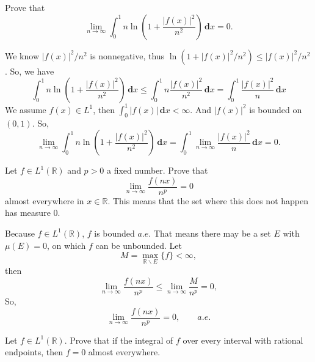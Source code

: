 \documentclass[12pt]{article}
\newenvironment{exercise}[1]{\begin{tcolorbox}[colback=black!15, colframe=black!80, breakable, title=#1]}{\end{tcolorbox}}
\newenvironment{solution}{\begin{tcolorbox}[colback=white, colframe=black!50, breakable, title=Solution. ]\setlength{\parskip}{0.8em}}{\end{tcolorbox}}
\newcommand{\der}{\,\mathbf{d}}
\begin{document}
    \begin{exercise}{9}
        Prove that 
        \[
            \lim_{n\to \infty}\int_0^1 n\ln(1+\frac{|f(x)|^2}{n^2})\der x=0. 
        \]
    \end{exercise}

    \begin{solution}
        We know $|f(x)|^2/n^2$ is nonnegative, thus $\ln(1+|f(x)|^2/n^2)\leqslant |f(x)|^2/n^2$. So, we have
        \[
            \int_0^1n\ln\left(1+\frac{|f(x)|^2}{n^2}\right)\der x\leqslant \int_0^1n\frac{|f(x)|^2}{n^2}\der x=\int_0^1\frac{|f(x)|^2}{n}\der x
        \]
        We assume $f(x)\in L^1$, then $\int_0^1|f(x)|\der x<\infty$. And $|f(x)|^2$ is bounded on $(0,1)$. So, 
        \[
            \lim_{n\to \infty}\int_0^1 n\ln\left(1+\frac{|f(x)|^2}{n^2}\right)\der x=\int_0^1\lim_{n\to \infty}\frac{|f(x)|^2}{n}\der x=0. 
        \]
    \end{solution}

    \begin{exercise}{10}
        Let $f \in L^1(\mathbb{R})$ and $p > 0$ a fixed number. Prove that
        \[
            \lim_{n\to\infty}\frac{f(nx)}{n^p}=0
        \]
        almost everywhere in $x \in \mathbb{R}$. This means that the set where this does not happen has measure 0. 
    \end{exercise}

    \begin{solution}
        Because $f\in L^1(\mathbb{R})$, $f$ is bounded $a.e$. That means there may be a set $E$ with $\mu(E)=0$, on which $f$ can be unbounded. Let 
        \[
            M=\max_{\mathbb{R}\backslash E}\{f\}<\infty, 
        \]
        then
        \[
            \lim_{n\to\infty}\frac{f(nx)}{n^p}\leqslant\lim_{n\to\infty}\frac{M}{n^p}=0, 
        \]
        So, 
        \[
            \lim_{n\to\infty}\frac{f(nx)}{n^p}=0, \qquad a.e. 
        \]
    \end{solution}

    \begin{exercise}{11}
        Let $f \in L^1(\mathbb{R})$. Prove that if the integral of $f$ over every interval with rational endpoints, then $f = 0$ almost everywhere. 
    \end{exercise}
\end{document}

